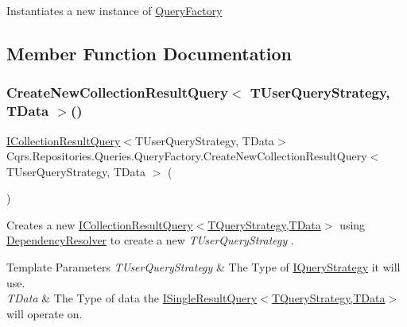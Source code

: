 Instantiates a new instance of \hyperlink{classCqrs_1_1Repositories_1_1Queries_1_1QueryFactory}{Query\+Factory} 



\subsection{Member Function Documentation}
\mbox{\label{classCqrs_1_1Repositories_1_1Queries_1_1QueryFactory_aaadcf9eb14390c49d668023a9e9950d7_aaadcf9eb14390c49d668023a9e9950d7}} 
\subsubsection{\texorpdfstring{Create\+New\+Collection\+Result\+Query$<$ T\+User\+Query\+Strategy, T\+Data $>$()}{CreateNewCollectionResultQuery< TUserQueryStrategy, TData >()}}
{\footnotesize\ttfamily \hyperlink{interfaceCqrs_1_1Repositories_1_1Queries_1_1ICollectionResultQuery}{I\+Collection\+Result\+Query}$<$T\+User\+Query\+Strategy, T\+Data$>$ Cqrs.\+Repositories.\+Queries.\+Query\+Factory.\+Create\+New\+Collection\+Result\+Query$<$ T\+User\+Query\+Strategy, T\+Data $>$ (\begin{DoxyParamCaption}{ }\end{DoxyParamCaption})}



Creates a new \hyperlink{interfaceCqrs_1_1Repositories_1_1Queries_1_1ICollectionResultQuery}{I\+Collection\+Result\+Query$<$\+T\+Query\+Strategy,\+T\+Data$>$} using \hyperlink{classCqrs_1_1Repositories_1_1Queries_1_1QueryFactory_a550e1e11b126247c5adebdd384000252_a550e1e11b126247c5adebdd384000252}{Dependency\+Resolver} to create a new {\itshape T\+User\+Query\+Strategy} . 


\begin{DoxyTemplParams}{Template Parameters}
{\em T\+User\+Query\+Strategy} & The Type of \hyperlink{interfaceCqrs_1_1Repositories_1_1Queries_1_1IQueryStrategy}{I\+Query\+Strategy} it will use.\\
\hline
{\em T\+Data} & The Type of data the \hyperlink{interfaceCqrs_1_1Repositories_1_1Queries_1_1ISingleResultQuery}{I\+Single\+Result\+Query$<$\+T\+Query\+Strategy,\+T\+Data$>$} will operate on.\\
\hline
\end{DoxyTemplParams}


